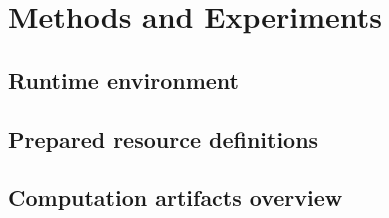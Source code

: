 \chapter{Methods and Experiments}

\section{Runtime environment}

\section{Prepared resource definitions}

\section{Computation artifacts overview}